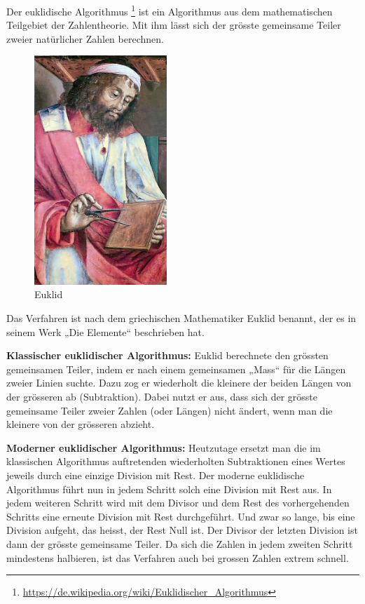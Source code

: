 Der euklidische  Algorithmus  \footnote{ \url{ https://de.wikipedia.org/wiki/Euklidischer_Algorithmus}} ist ein Algorithmus aus dem mathematischen Teilgebiet der Zahlentheorie. Mit ihm lässt sich der grösste gemeinsame Teiler  zweier natürlicher Zahlen berechnen. 

\begin{figure}
  \vspace{-14pt}
  \includegraphics[width=5cm]{./screenshots/euklid.jpg}
  \vspace{-14pt}
  \caption{Euklid}
  \label{fig:euklid}
  \vspace{-30pt}
\end{figure}


Das Verfahren ist nach dem griechischen Mathematiker Euklid benannt, der es in seinem Werk „Die Elemente“ beschrieben hat.

\textbf{Klassischer euklidischer Algorithmus:} Euklid berechnete den grössten gemeinsamen Teiler, indem er nach einem gemeinsamen „Mass“ für die Längen zweier Linien suchte. Dazu zog er wiederholt die kleinere der beiden Längen von der grösseren ab (Subtraktion). Dabei nutzt er aus, dass sich der grösste gemeinsame Teiler zweier Zahlen (oder Längen) nicht ändert, wenn man die kleinere von der grösseren abzieht.

\textbf{Moderner euklidischer Algorithmus:} Heutzutage ersetzt man die im klassischen Algorithmus auftretenden wiederholten Subtraktionen eines Wertes jeweils durch eine einzige Division mit Rest. Der moderne euklidische Algorithmus führt nun in jedem Schritt solch eine Division mit Rest aus. In jedem weiteren Schritt wird mit dem Divisor und dem Rest des vorhergehenden Schritts eine erneute Division mit Rest durchgeführt. Und zwar so lange, bis eine Division aufgeht, das heisst, der Rest Null ist. Der Divisor der letzten Division ist dann der grösste gemeinsame Teiler. Da sich die Zahlen in jedem zweiten Schritt mindestens halbieren, ist das Verfahren auch bei grossen Zahlen extrem schnell.

